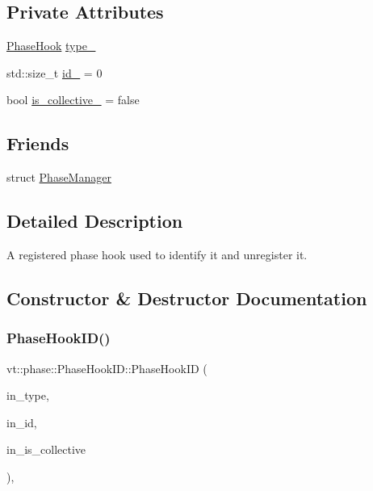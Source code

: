 \subsection*{Private Attributes}
\begin{DoxyCompactItemize}
\item 
\hyperlink{namespacevt_1_1phase_aec9a63fdd99680d7a7fe99d321193811}{Phase\+Hook} \hyperlink{structvt_1_1phase_1_1_phase_hook_i_d_a6c2f927ed509d68a0acd18c47f47679b}{type\+\_\+}
\item 
std\+::size\+\_\+t \hyperlink{structvt_1_1phase_1_1_phase_hook_i_d_afccddafce973b00c55d3ac4e7c4635d5}{id\+\_\+} = 0
\item 
bool \hyperlink{structvt_1_1phase_1_1_phase_hook_i_d_a56d0ba883374ef1eb57dcbbb094511da}{is\+\_\+collective\+\_\+} = false
\end{DoxyCompactItemize}
\subsection*{Friends}
\begin{DoxyCompactItemize}
\item 
struct \hyperlink{structvt_1_1phase_1_1_phase_hook_i_d_a346e5d84677fffb1e9f1f393b7d13779}{Phase\+Manager}
\end{DoxyCompactItemize}


\subsection{Detailed Description}
A registered phase hook used to identify it and unregister it. 

\subsection{Constructor \& Destructor Documentation}
\mbox{\label{structvt_1_1phase_1_1_phase_hook_i_d_a2e8a595296be3f2a49f59c5f0287d9e5}} 
\subsubsection{\texorpdfstring{Phase\+Hook\+I\+D()}{PhaseHookID()}}
{\footnotesize\ttfamily vt\+::phase\+::\+Phase\+Hook\+I\+D\+::\+Phase\+Hook\+ID (\begin{DoxyParamCaption}\item[{\hyperlink{namespacevt_1_1phase_aec9a63fdd99680d7a7fe99d321193811}{Phase\+Hook}}]{in\+\_\+type,  }\item[{std\+::size\+\_\+t}]{in\+\_\+id,  }\item[{bool}]{in\+\_\+is\+\_\+collective }\end{DoxyParamCaption})\hspace{0.3cm}{\ttfamily [inline]}, {\ttfamily [private]}}



